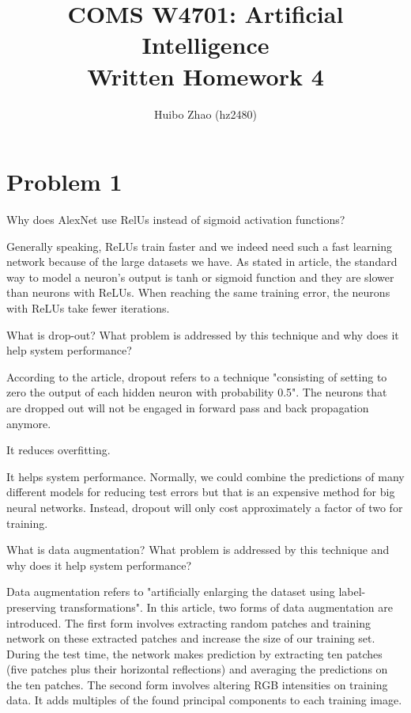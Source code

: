 \documentclass[11pt]{article}
\begin{document}
 
 
\title{COMS W4701: Artificial Intelligence\\
       Written Homework 4}
\author{Huibo Zhao (hz2480)} %
\maketitle

\section*{Problem 1} 

Why does AlexNet use RelUs instead of sigmoid activation functions?  \newline

Generally speaking, ReLUs train faster and we indeed need such a fast learning network because of the large datasets we have. As stated in article, the standard way to model a neuron's output is tanh or sigmoid function and they are slower than neurons with ReLUs. When reaching the same training error, the neurons with ReLUs take fewer iterations. \newline
 
\noindent What is drop-out? What problem is addressed by this technique and why does it help system performance? \newline

According to the article, dropout refers to a technique "consisting of setting to zero the output of each hidden neuron with probability 0.5".  The neurons that are dropped out will not be engaged in forward pass and back propagation anymore. \newline

It reduces overfitting. \newline

It helps system performance. Normally, we could combine the predictions of many different models for reducing test errors but that is an expensive method for big neural networks. Instead, dropout will only cost approximately a factor of two for training. \newline

\noindent What is data augmentation? What problem is addressed by this technique and why does it help system performance? \newline

Data augmentation refers to "artificially enlarging the dataset using label-preserving transformations". In this article, two forms of data augmentation are introduced. The first form involves extracting random patches and training network on these extracted patches and increase the size of our training set. During the test time, the network makes prediction by extracting ten patches (five patches plus their horizontal reflections) and averaging the predictions on the ten patches. The second form involves altering RGB intensities on training data. It adds multiples of the found principal components to each training image. \newline
\end{document}
